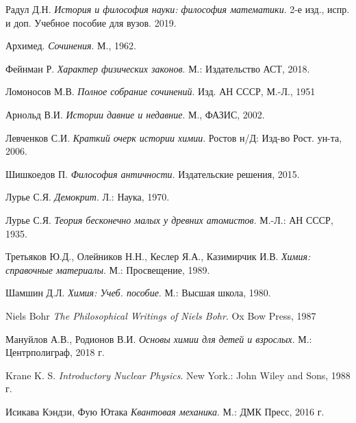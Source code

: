 \begin{thebibliography}{9}

Радул Д.Н. 
\textit{История и философия науки: философия математики}. 2-е изд., испр. и доп. Учебное пособие для вузов. 2019.

Архимед.
\textit{Сочинения}. М., 1962.

Фейнман Р.
\textit{Характер физических законов}. М.: Издательство АСТ, 2018.

Ломоносов М.В.
\textit{Полное собрание сочинений}. Изд. АН СССР, М.-Л., 1951

Арнольд В.И.
\textit{Истории давние и недавние}. М., ФАЗИС, 2002.

Левченков С.И.
\textit{Краткий очерк истории химии}. Ростов н/Д: Изд-во Рост. ун-та, 2006.

Шишкоедов П.
\textit{Философия античности}. Издательские решения, 2015.

Лурье С.Я.
\textit{Демокрит}. Л.: Наука, 1970.

Лурье С.Я.
\textit{Теория бесконечно малых у древних атомистов}.  М.-Л.: АН СССР, 1935.

Третьяков Ю.Д., Олейников Н.Н., Кеслер Я.А., Казимирчик И.В.
\textit{Химия: справочные материалы}. М.: Просвещение, 1989.

Шамшин Д.Л.
\textit{Химия: Учеб. пособие}. М.: Высшая школа, 1980.

Niels Bohr
\textit{The Philosophical Writings of Niels Bohr}. Ox Bow Press, 1987

Мануйлов А.В., Родионов В.И.
\textit{Основы химии для детей и взрослых}. М.: Центрполиграф, 2018 г.

Krane K. S. 
\textit{Introductory Nuclear Physics}. New York.: John Wiley and Sons, 1988 г.

Исикава Кэндзи, Фую Ютака
\textit{Квантовая механика}. М.: ДМК Пресс, 2016 г.





\end{thebibliography}
